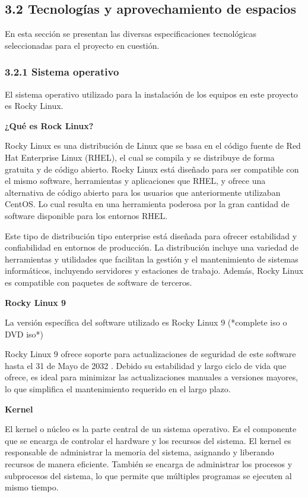 \begin{spacing}{1.5}
  \subsection{3.2 Tecnologías y aprovechamiento de espacios}
  \label{chap:3.2}
  En esta sección se presentan las diversas especificaciones tecnológicas
  seleccionadas para el proyecto en cuestión.

  \subsubsection{3.2.1 Sistema operativo}
  El sistema operativo utilizado para la instalación de los equipos en este
  proyecto es Rocky Linux.

  \textbf{¿Qué es Rock Linux?}

  Rocky Linux es una distribución de Linux que se basa en el código fuente de
  Red Hat Enterprise Linux (RHEL), el cual se compila y se distribuye de forma
  gratuita y de código abierto. Rocky Linux está diseñado para ser compatible con
  el mismo software, herramientas y aplicaciones que RHEL, y ofrece una
  alternativa de código abierto para los usuarios que anteriormente utilizaban
  CentOS. Lo cual resulta en una herramienta poderosa por la gran cantidad de
  software disponible para los entornos RHEL.

  Este tipo de distribución tipo enterprise está diseñada para ofrecer
  estabilidad y confiabilidad en entornos de producción. La distribución incluye
  una variedad de herramientas y utilidades que facilitan la gestión y el
  mantenimiento de sistemas informáticos, incluyendo servidores y estaciones de
  trabajo. Además, Rocky Linux es compatible con paquetes de software de
  terceros. \cite{RL-1}

  \textbf{Rocky Linux 9}

  La versión específica del software utilizado es Rocky Linux 9 (*complete
  iso o DVD iso*) \cite{RL9-download-1} \cite{RL9-release-1}
  \cite{RHEL-release-1}

  Rocky Linux 9 ofrece soporte para actualizaciones de seguridad de este
  software hasta el 31 de Mayo de 2032 \cite{RL9-EOL-1}. Debido su estabilidad y
  largo ciclo de vida que ofrece, es ideal para minimizar las actualizaciones
  manuales a versiones mayores, lo que simplifica el mantenimiento requerido en
  el largo plazo.

  \textbf{Kernel}

  El kernel o núcleo es la parte central de un sistema operativo. Es el
  componente que se encarga de controlar el hardware y los recursos del sistema.
  El kernel es responsable de administrar la memoria del sistema, asignando y
  liberando recursos de manera eficiente. También se encarga de administrar los
  procesos y subprocesos del sistema, lo que permite que múltiples programas se
  ejecuten al mismo tiempo.


\end{spacing}
